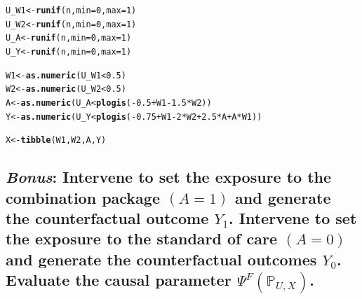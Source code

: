 \documentclass{article}\usepackage[]{graphicx}\usepackage[]{xcolor}
\makeatletter
\newcommand{\hlnum}[1]{\textcolor[rgb]{0.686,0.059,0.569}{#1}}%
\newcommand{\hlopt}[1]{\textcolor[rgb]{0,0,0}{#1}}%
\newcommand{\hlstd}[1]{\textcolor[rgb]{0.345,0.345,0.345}{#1}}%
\newcommand{\hlkwb}[1]{\textcolor[rgb]{0.69,0.353,0.396}{#1}}%
\newcommand{\hlkwc}[1]{\textcolor[rgb]{0.333,0.667,0.333}{#1}}%
\newcommand{\hlkwd}[1]{\textcolor[rgb]{0.737,0.353,0.396}{\textbf{#1}}}%
\newenvironment{kframe}{%
 \def\at@end@of@kframe{}%
 \ifinner\ifhmode%
  \def\at@end@of@kframe{\end{minipage}}%
  \begin{minipage}{\columnwidth}%
 \fi\fi%
 \def\FrameCommand##1{\hskip\@totalleftmargin \hskip-\fboxsep
 \colorbox{shadecolor}{##1}\hskip-\fboxsep
     \hskip-\linewidth \hskip-\@totalleftmargin \hskip\columnwidth}%
 \MakeFramed {\advance\hsize-\width
   \@totalleftmargin\z@ \linewidth\hsize
   \@setminipage}}%
 {\par\unskip\endMakeFramed%
 \at@end@of@kframe}
\newenvironment{knitrout}{}{} %
\makeatother
\begin{document}
\begin{knitrout}
\color{fgcolor}\begin{kframe}
\begin{alltt}
\hlstd{U_W1} \hlkwb{<-} \hlkwd{runif}\hlstd{(n,} \hlkwc{min}\hlstd{=}\hlnum{0}\hlstd{,} \hlkwc{max}\hlstd{=}\hlnum{1}\hlstd{)}
\hlstd{U_W2} \hlkwb{<-} \hlkwd{runif}\hlstd{(n,} \hlkwc{min}\hlstd{=}\hlnum{0}\hlstd{,} \hlkwc{max}\hlstd{=}\hlnum{1}\hlstd{)}
\hlstd{U_A} \hlkwb{<-} \hlkwd{runif}\hlstd{(n,} \hlkwc{min}\hlstd{=}\hlnum{0}\hlstd{,} \hlkwc{max}\hlstd{=}\hlnum{1}\hlstd{)}
\hlstd{U_Y} \hlkwb{<-} \hlkwd{runif}\hlstd{(n,} \hlkwc{min}\hlstd{=}\hlnum{0}\hlstd{,} \hlkwc{max}\hlstd{=}\hlnum{1}\hlstd{)}

\hlstd{W1} \hlkwb{<-} \hlkwd{as.numeric}\hlstd{(U_W1} \hlopt{<} \hlnum{0.5}\hlstd{)}
\hlstd{W2} \hlkwb{<-} \hlkwd{as.numeric}\hlstd{(U_W2} \hlopt{<} \hlnum{0.5}\hlstd{)}
\hlstd{A} \hlkwb{<-} \hlkwd{as.numeric}\hlstd{(U_A} \hlopt{<} \hlkwd{plogis}\hlstd{(}\hlopt{-}\hlnum{0.5}\hlopt{+}\hlstd{W1}\hlopt{-}\hlnum{1.5}\hlopt{*}\hlstd{W2))}
\hlstd{Y} \hlkwb{<-} \hlkwd{as.numeric}\hlstd{(U_Y} \hlopt{<} \hlkwd{plogis}\hlstd{(}\hlopt{-}\hlnum{0.75}\hlopt{+}\hlstd{W1}\hlopt{-}\hlnum{2}\hlopt{*}\hlstd{W2}\hlopt{+}\hlnum{2.5}\hlopt{*}\hlstd{A}\hlopt{+}\hlstd{A}\hlopt{*}\hlstd{W1))}

\hlstd{X} \hlkwb{<-} \hlkwd{tibble}\hlstd{(W1, W2, A, Y)}
\end{alltt}
\end{kframe}
\end{knitrout}
  
  
  \subsection{\textit{Bonus}: Intervene to set the exposure to the combination package $(A=1)$ and generate the counterfactual outcome $Y_1$. Intervene to set the exposure to the standard of care $(A=0)$ and generate the counterfactual outcomes $Y_0$. Evaluate the causal parameter $\Psi^F(\mathbb{P}_{U,X})$.}
  
\end{document}
